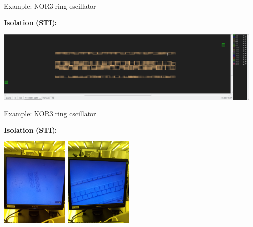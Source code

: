 \documentclass[aspectratio=169]{beamer}
\begin{document}
\begin{frame}{Example: NOR3 ring oscillator}
	\begin{center}
		\textbf{Isolation (STI):}

		\includegraphics[width=\textwidth]{images/Screenshot_20181220_164222.png}
	\end{center}
\end{frame}

\begin{frame}{Example: NOR3 ring oscillator}
\begin{center}
	\textbf{Isolation (STI):}

	\includegraphics[width=0.25\textwidth]{images/20181219_125354_Burst01.jpg}
	\includegraphics[width=0.25\textwidth]{images/20181219_125758.jpg}
\end{center}
\end{frame}
\end{document}
